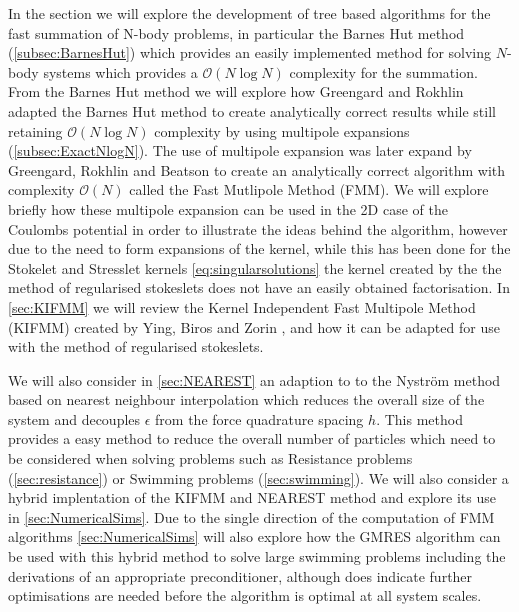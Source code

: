 In the section we will explore the development of tree based algorithms for the fast summation of N-body problems, in particular the Barnes Hut method \cite{Barnes1986}(\cref{subsec:BarnesHut}) which provides an easily implemented method for solving $N$-body systems which provides a $\mathcal{O}(N\log N)$ complexity for the summation. From the Barnes Hut method we will explore how Greengard and Rokhlin \cite{1988The0-262-7110-X.,Rokhlin1985RapidTheory,Greengard1987ASimulations} adapted the Barnes Hut method to create analytically correct results while still retaining $\mathcal{O}(N\log N)$ complexity by using multipole expansions (\cref{subsec:ExactNlogN}). The use of multipole expansion was later expand by Greengard, Rokhlin and Beatson \cite{Beatson,Greengard1987ASimulations} to create an analytically correct algorithm with complexity $\mathcal{O}(N)$ called the Fast Mutlipole Method (FMM). We will explore briefly how these multipole expansion can be used in the 2D case of the Coulombs potential in order to illustrate the ideas behind the algorithm, however due to the need to form expansions of the kernel, while this has been done for the Stokelet and Stresslet kernels \cref{eq:singularsolutions} \cite{Tornberg2008} the kernel created by the the method of regularised stokeslets does not have an easily obtained factorisation. In \cref{sec:KIFMM} we will review the Kernel Independent Fast Multipole Method (KIFMM) created by Ying, Biros and Zorin \cite{Ying2004}, and how it can be adapted for use with the method of regularised stokeslets. 

We will also consider in \cref{sec:NEAREST} an adaption to to the Nyström method based on nearest neighbour interpolation which reduces the overall size of the system and decouples $\epsilon$ from the force quadrature spacing $h$. This method provides a easy method to reduce the overall number of particles which need to be considered when solving problems such as Resistance problems (\cref{sec:resistance}) or Swimming problems (\cref{sec:swimming}).
We will also consider a hybrid implentation of the KIFMM and NEAREST method and explore its use in \cref{sec:NumericalSims}. Due to the single direction of the computation of FMM algorithms \cref{sec:NumericalSims} will also explore how the GMRES algorithm can be used with this hybrid method to solve large swimming problems including the derivations of an appropriate preconditioner, although does indicate further optimisations are needed before the algorithm is optimal at all system scales.  

